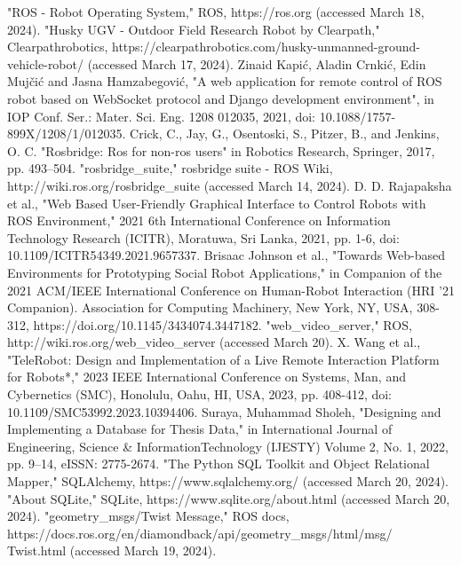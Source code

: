 \documentclass[conference]{IEEEtran}
\begin{document}
\begin{thebibliography}{00}
"ROS - Robot Operating System," ROS, https://ros.org (accessed March 18, 2024).
"Husky UGV - Outdoor Field Research Robot by Clearpath," Clearpathrobotics, https://clearpathrobotics.com/husky-unmanned-ground-vehicle-robot/ (accessed March 17, 2024).
 Zinaid Kapić, Aladin Crnkić, Edin Mujčić and Jasna Hamzabegović, "A web application for remote control of ROS robot based on WebSocket protocol and Django development environment", in IOP Conf. Ser.: Mater. Sci. Eng. 1208 012035, 2021, doi: 10.1088/1757-899X/1208/1/012035.
 Crick, C., Jay, G., Osentoski, S., Pitzer, B., and Jenkins, O. C. "Rosbridge: Ros for non-ros users" in Robotics Research, Springer, 2017, pp. 493--504.
"rosbridge\_suite," rosbridge suite - ROS Wiki, http://wiki.ros.org/rosbridge\_suite (accessed March 14, 2024).
 D. D. Rajapaksha et al., "Web Based User-Friendly Graphical Interface to Control Robots with ROS Environment," 2021 6th International Conference on Information Technology Research (ICITR), Moratuwa, Sri Lanka, 2021, pp. 1-6, doi: 10.1109/ICITR54349.2021.9657337.
Brisaac Johnson et al., "Towards Web-based Environments for Prototyping Social Robot Applications," in Companion of the 2021 ACM/IEEE International Conference on Human-Robot Interaction (HRI '21 Companion). Association for Computing Machinery, New York, NY, USA, 308-312, https://doi.org/10.1145/3434074.3447182.
"web\_video\_server," ROS, http://wiki.ros.org/web\_video\_server (accessed March 20).
X. Wang et al., "TeleRobot: Design and Implementation of a Live Remote Interaction Platform for Robots*," 2023 IEEE International Conference on Systems, Man, and Cybernetics (SMC), Honolulu, Oahu, HI, USA, 2023, pp. 408-412, doi: 10.1109/SMC53992.2023.10394406.
 Suraya, Muhammad Sholeh, "Designing and Implementing a Database for Thesis Data," in International Journal of Engineering, Science \& InformationTechnology (IJESTY) Volume 2, No. 1, 2022, pp. 9--14, eISSN: 2775-2674.
"The Python SQL Toolkit and Object Relational Mapper," SQLAlchemy, https://www.sqlalchemy.org/ (accessed March 20, 2024).
"About SQLite," SQLite, https://www.sqlite.org/about.html (accessed March 20, 2024).
"geometry\_msgs/Twist Message," ROS docs, https://docs.ros.org/en/diamondback/api/geometry\_msgs/html/msg/\\Twist.html (accessed March 19, 2024).

\end{thebibliography}
\end{document}
